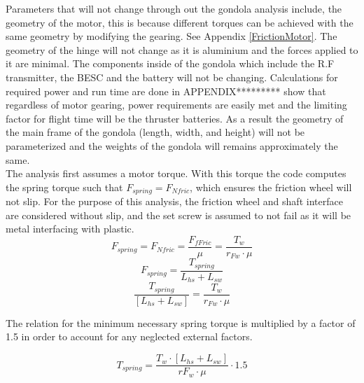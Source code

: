\documentclass[../main.tex]{subfiles}
\begin{document}
Parameters that will not change through out the gondola analysis include, the geometry of the motor, this is because different torques can be achieved with the same geometry by modifying the gearing. See Appendix \ref{FrictionMotor}. The geometry of the hinge will not change as it is aluminium and the forces applied to it are minimal. The components inside of the gondola which include the R.F transmitter, the BESC and the battery will not be changing. Calculations for required power and run time are done in APPENDIX********* show that regardless of motor gearing, power requirements are easily met and the limiting factor for flight time will be the thruster batteries. As a result the geometry of the main frame of the gondola (length, width, and height) will not be parameterized and the weights of the gondola will remains approximately the same. \\

The analysis first assumes a motor torque. With this torque the code computes the spring torque such that $F_{spring} = F_{Nfric}$, which ensures the friction wheel will not slip. For the purpose of this analysis, the friction wheel and shaft interface are considered without slip, and the set screw is assumed to not fail as it will be metal interfacing with plastic.
\begin{equation}
F_{spring} = F_{Nfric} = \frac{F_{fFric}}{\mu} = \frac{T_w}{r_{Fw}\cdot{}\mu}
\end{equation}
\begin{equation}
F_{spring} = \frac{T_{spring}}{L_{hs}+L_{sw}}
\end{equation}
\begin{equation}
\frac{T_{spring}}{[L_{hs}+L_{sw}]} = \frac{T_w}{r_{Fw}\cdot{}\mu}
\end{equation}

The relation for the minimum necessary spring torque is multiplied by a factor of 1.5 in order to account for any neglected external factors.

\begin{equation}
T_{spring} = \frac{T_w\cdot{}[L_{hs}+L_{sw}]}{r{F_w}\cdot{}\mu}\cdot{}1.5
\end{equation}
\end{document}
